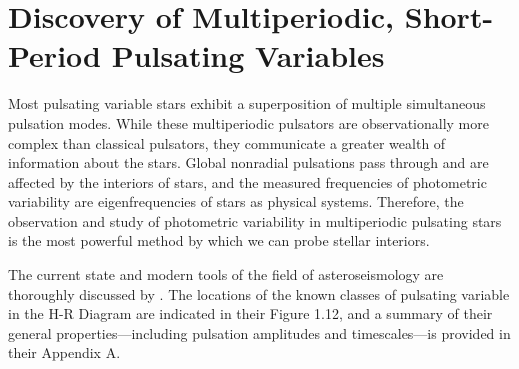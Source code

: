 

%
%
%
%
%
%

\section{Discovery of Multiperiodic, Short-Period Pulsating Variables}
\def\secname{multiperiodicvariables}\label{sec:\secname}



Most pulsating variable stars exhibit a superposition of multiple simultaneous pulsation modes.  While these multiperiodic pulsators are observationally more complex than classical pulsators, they communicate a greater wealth of information about the stars.  Global nonradial pulsations pass through and are affected by the interiors of stars, and the measured frequencies of photometric variability are eigenfrequencies of stars as physical systems.  Therefore, the observation and study of photometric variability in multiperiodic pulsating stars is the most powerful method by which we can probe stellar interiors.  

The current state and modern tools of the field of asteroseismology are thoroughly discussed by \citet{2010aste.book.....A}.  The locations of the known classes of pulsating variable in the H-R Diagram are indicated in their Figure 1.12, and a summary of their general properties---including pulsation amplitudes and timescales---is provided in their Appendix A.  

